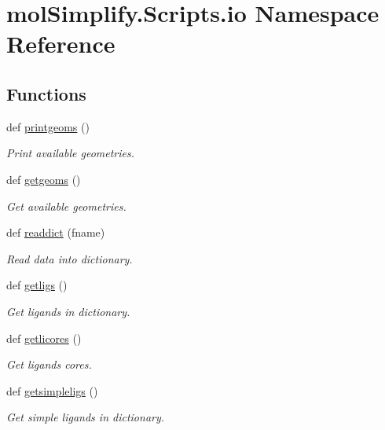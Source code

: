 \hypertarget{namespacemolSimplify_1_1Scripts_1_1io}{}\section{mol\+Simplify.\+Scripts.\+io Namespace Reference}
\label{namespacemolSimplify_1_1Scripts_1_1io}
\subsection*{Functions}
\begin{DoxyCompactItemize}
\item 
def \hyperlink{namespacemolSimplify_1_1Scripts_1_1io_ae8fe714fa87ea53098f7de59b36ab719}{printgeoms} ()
\begin{DoxyCompactList}\small\item\em Print available geometries. \end{DoxyCompactList}\item 
def \hyperlink{namespacemolSimplify_1_1Scripts_1_1io_ab1ff5bbf184269fdb1464dac6d802e5b}{getgeoms} ()
\begin{DoxyCompactList}\small\item\em Get available geometries. \end{DoxyCompactList}\item 
def \hyperlink{namespacemolSimplify_1_1Scripts_1_1io_a3bbc8b914bae35e79ac16c443f01a077}{readdict} (fname)
\begin{DoxyCompactList}\small\item\em Read data into dictionary. \end{DoxyCompactList}\item 
def \hyperlink{namespacemolSimplify_1_1Scripts_1_1io_a20155860cf65f34b07ec8a16d43a5c1e}{getligs} ()
\begin{DoxyCompactList}\small\item\em Get ligands in dictionary. \end{DoxyCompactList}\item 
def \hyperlink{namespacemolSimplify_1_1Scripts_1_1io_a1191d4d66f956b9ebb9f2b49e6c1ba04}{getlicores} ()
\begin{DoxyCompactList}\small\item\em Get ligands cores. \end{DoxyCompactList}\item 
def \hyperlink{namespacemolSimplify_1_1Scripts_1_1io_a78464c05e4823eb46028f344815c80c5}{getsimpleligs} ()
\begin{DoxyCompactList}\small\item\em Get simple ligands in dictionary. \end{DoxyCompactList}\item 

\end{DoxyCompactItemize}
